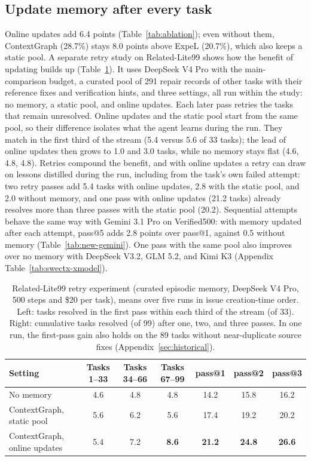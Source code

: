 \documentclass{article}
\begin{document}
\subsection{Update memory after every task}
\label{sec:stream}
\label{sec:retries}
Online updates add 6.4 points (Table~\ref{tab:ablation}); even without them,
ContextGraph (28.7\%) stays 8.0 points above ExpeL (20.7\%), which also
keeps a static pool. A separate retry study on Related-Lite99 shows
how the benefit of updating builds up (Table~\ref{tab:stream-position}). It
uses DeepSeek V4 Pro with the main-comparison budget, a curated pool of 291
repair records of other tasks with their reference fixes and verification
hints, and three settings, all run within the study:
no memory, a static pool, and online updates. Each later pass retries the tasks
that remain unresolved. Online updates and the static pool start from the
same pool, so their difference isolates what the agent learns during the run.
They match in the first third of the stream (5.4 versus 5.6 of 33 tasks);
the lead of online updates then grows to 1.0 and 3.0 tasks, while no memory
stays flat (4.6, 4.8, 4.8). Retries compound the benefit, and with online
updates a retry can draw on lessons distilled during the run, including from
the task's own failed attempt: two
retry passes add 5.4 tasks with online updates, 2.8 with the static pool, and
2.0 without memory, and one pass with online updates (21.2 tasks) already
resolves more than three passes with the static pool (20.2). Sequential
attempts behave the same way with Gemini 3.1 Pro on Verified500: with memory
updated after each attempt, pass@5 adds 2.8 points over pass@1, against 0.5
without memory (Table~\ref{tab:new-gemini}). One pass with the same pool
also improves over no memory with DeepSeek V3.2, GLM 5.2, and Kimi K3 (Appendix
Table~\ref{tab:swectx-xmodel}).

\begin{table}[!htbp]
\centering
\caption{Related-Lite99 retry experiment (curated episodic memory,
DeepSeek V4 Pro, 500 steps and \$20 per task),
means over five runs in issue creation-time order. Left: tasks resolved in
the first pass within each third of the stream (of 33). Right: cumulative
tasks resolved (of 99) after one, two, and three passes. In one run, the
first-pass gain also holds on the 89 tasks without near-duplicate source
fixes (Appendix~\ref{sec:historical}).}
\label{tab:stream-position}
\small
\setlength{\tabcolsep}{3pt}
\begin{tabular}{lcccccc}
\toprule
Setting & Tasks 1--33 & Tasks 34--66 & Tasks 67--99 & pass@1 & pass@2 & pass@3 \\
\midrule
No memory & 4.6 & 4.8 & 4.8 & 14.2 & 15.8 & 16.2 \\
ContextGraph, static pool & 5.6 & 6.2 & 5.6 & 17.4 & 19.2 & 20.2 \\
ContextGraph, online updates & 5.4 & 7.2 & \textbf{8.6} & \textbf{21.2} & \textbf{24.8} & \textbf{26.6} \\
\bottomrule
\end{tabular}
\end{table}
\end{document}
